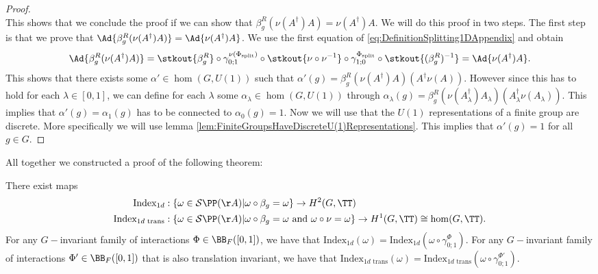 \begin{proof}
\begin{equation}
	\end{equation}
	This shows that we conclude the proof if we can show that $\beta_g^R(\nu(A^\dagger)A)=\nu(A^\dagger)A$. We will do this proof in two steps. The first step is that we prove that $\Ad{\beta_g^R(\nu(A^\dagger)A)}=\Ad{\nu(A^\dagger)A}$. We use the first equation of \eqref{eq:DefinitionSplitting1DAppendix} and obtain
	\begin{align}
		\Ad{\beta_g^R(\nu(A^\dagger)A)}=\stkout{\beta_g^R}\circ\gamma^{\nu(\Phi_{\text{split}})}_{0;1}\circ\stkout{\nu\circ\nu^{-1}}\circ\gamma^{\Phi_{\text{split}}}_{1;0}\circ\stkout{(\beta_g^R)^{-1}}=\Ad{\nu(A^\dagger)A}.
	\end{align}
	This shows that there exists some $\alpha'\in\hom(G,U(1))$ such that $\alpha'(g)=\beta_g^R(\nu(A^\dagger)A)(A^\dagger \nu(A))$. However since this has to hold for each $\lambda\in[0,1]$, we can define for each $\lambda$ some $\alpha_\lambda\in\hom(G,U(1))$ through $\alpha_\lambda(g)=\beta_g^R(\nu(A^\dagger_\lambda)A_\lambda)(A^\dagger_\lambda \nu(A_\lambda))$. This implies that $\alpha'(g)=\alpha_1(g)$ has to be connected to $\alpha_0(g)=1$. Now we will use that the $U(1)$ representations of a finite group are discrete. More specifically we will use lemma \ref{lem:FiniteGroupsHaveDiscreteU(1)Representations}. This implies that $\alpha'(g)=1$ for all $g\in G$.
\end{proof}
All together we constructed a proof of the following theorem:
\begin{theorem}
	There exist maps
	\begin{align}
		\textrm{Index}_{1d}&:\{\omega\in\mathcal{S}\PP(\AA)|\omega\circ\beta_g=\omega\}\rightarrow H^2(G,\TT)\\
		\nonumber
		\textrm{Index}_{1d\text{ trans}}&:\{\omega\in\mathcal{S}\PP(\AA)|\omega\circ\beta_g=\omega\text{ and }\omega\circ\nu=\omega\}\rightarrow H^1(G,\TT)\cong \hom(G,\TT).
	\end{align}
	For any $G-$invariant family of interactions $\Phi\in\BB_{F}([0,1])$, we have that $\textrm{Index}_{1d}(\omega)=\textrm{Index}_{1d}(\omega\circ\gamma^\Phi_{0;1})$. For any $G-$invariant family of interactions $\Phi'\in\BB_{F}([0,1])$ that is also translation invariant, we have that $\textrm{Index}_{1d\text{ trans}}(\omega)=\textrm{Index}_{1d\text{ trans}}(\omega\circ\gamma^{\Phi'}_{0;1})$.
\end{theorem}

